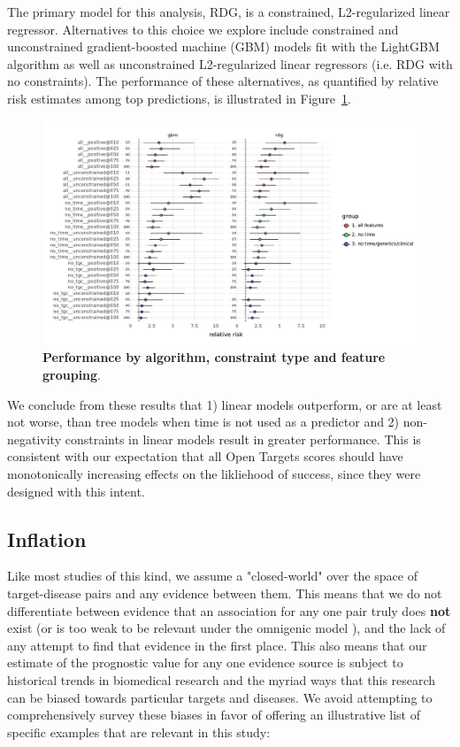 \documentclass{article}
\begin{document}
The primary model for this analysis, RDG, is a constrained, L2-regularized linear regressor. Alternatives to this choice we explore include constrained and unconstrained gradient-boosted machine (GBM) models fit with the LightGBM \cite{LightGBM} algorithm as well as unconstrained L2-regularized linear regressors (i.e. RDG with no constraints). The performance of these alternatives, as quantified by relative risk estimates among top predictions, is illustrated in Figure~\ref{fig:relative_risk_model_features}. 

\begin{figure}[!htb]
  \centering
  \captionsetup{width=.9\linewidth}
  \includegraphics[width=1\textwidth]{relative_risk_model_features.pdf}
  \caption{
    \textbf{Performance by algorithm, constraint type and feature grouping}.  
  }
  \label{fig:relative_risk_model_features}
\end{figure}

We conclude from these results that 1) linear models outperform, or are at least not worse, than tree models when time is not used as a predictor and 2) non-negativity constraints in linear models result in greater performance. This is consistent with our expectation that all Open Targets scores should have monotonically increasing effects on the likliehood of success, since they were designed with this intent.

\subsection{Inflation}
\label{sec:results_inflation}

Like most studies of this kind, we assume a "closed-world" \cite{Paliwal2020-hr} over the space of target-disease pairs and any evidence between them. This means that we do not differentiate between evidence that an association for any one pair truly does \textbf{not} exist (or is too weak to be relevant under the omnigenic model \cite{PMID:28622505}), and the lack of any attempt to find that evidence in the first place. This also means that our estimate of the prognostic value for any one evidence source is subject to historical trends in biomedical research and the myriad ways that this research can be biased towards particular targets and diseases. We avoid attempting to comprehensively survey these biases in favor of offering an illustrative list of specific examples that are relevant in this study:
\end{document}
